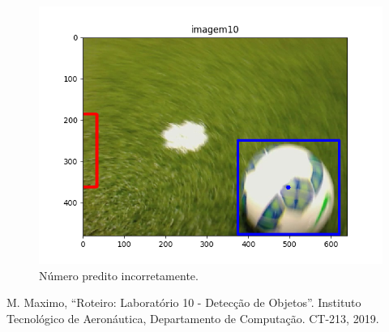 \documentclass[conference]{IEEEtran}
\begin{document}
\begin{figure}[htbp]
\centering
\centerline{\includegraphics[scale=0.5]{imagens/imagem10_detection.png}}
\caption{Número predito incorretamente.}
\label{imagem10_detection}
\end{figure}

\begin{thebibliography}{00}
 M. Maximo, ``Roteiro: Laboratório 10 - Detecção de Objetos''. Instituto Tecnológico de Aeronáutica, Departamento de Computação. CT-213, 2019.
\end{thebibliography}
\end{document}
